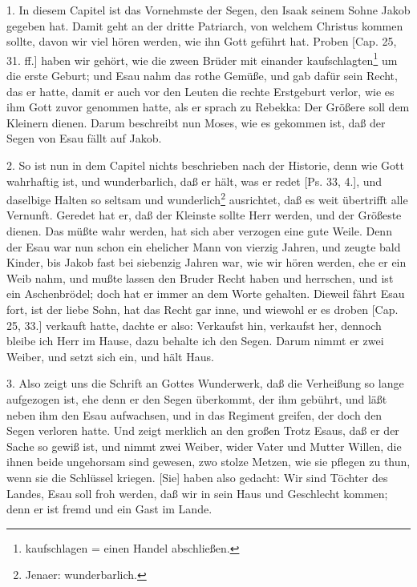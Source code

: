 1. In diesem Capitel ist das Vornehmste der Segen, den Isaak seinem Sohne Jakob gegeben hat. Damit geht an der dritte Patriarch, von welchem Christus kommen sollte, davon wir viel hören werden, wie ihn Gott geführt hat. Proben [Cap. 25, 31. ff.] haben wir gehört, wie die zween Brüder mit einander kaufschlagten\footnote{kaufschlagen = einen Handel abschließen.} um die erste Geburt; und Esau nahm das rothe Gemüße, und gab dafür sein Recht, das er hatte, damit er auch vor den Leuten die rechte Erstgeburt verlor, wie es ihm Gott zuvor genommen hatte, als er sprach zu Rebekka: Der Größere soll dem Kleinern dienen. Darum beschreibt nun Moses, wie es gekommen ist, daß der Segen von Esau fällt auf Jakob.

2. So ist nun in dem Capitel nichts beschrieben nach der Historie, denn wie Gott wahrhaftig ist, und wunderbarlich, daß er hält, was er redet [Ps. 33, 4.], und daselbige Halten so seltsam und wunderlich\footnote{Jenaer: wunderbarlich.} ausrichtet, daß es weit übertrifft alle Vernunft. Geredet hat er, daß der Kleinste sollte Herr werden, und der Größeste dienen. Das müßte wahr werden, hat sich aber verzogen eine gute Weile. Denn der Esau war nun schon ein ehelicher Mann von vierzig Jahren, und zeugte bald Kinder, bis Jakob fast bei siebenzig Jahren war, wie wir hören werden, ehe er ein Weib nahm, und mußte lassen den Bruder Recht haben und herrschen, und ist ein Aschenbrödel; doch hat er immer an dem Worte gehalten. Dieweil fährt Esau fort, ist der liebe Sohn, hat das Recht gar inne, und wiewohl er es droben [Cap. 25, 33.] verkauft hatte, dachte er also: Verkaufst hin, verkaufst her, dennoch bleibe ich Herr im Hause, dazu behalte ich den Segen. Darum nimmt er zwei Weiber, und setzt sich ein, und hält Haus.

3. Also zeigt uns die Schrift an Gottes Wunderwerk, daß die Verheißung so lange aufgezogen
ist, ehe denn er den Segen überkommt, der ihm gebührt, und läßt neben ihm den Esau aufwachsen, und in das Regiment greifen, der doch den Segen verloren hatte. Und zeigt merklich an den großen Trotz Esaus, daß er der Sache so gewiß ist, und nimmt zwei Weiber, wider Vater und Mutter Willen, die ihnen beide ungehorsam sind gewesen, zwo stolze Metzen, wie sie pflegen zu thun, wenn sie die Schlüssel kriegen. [Sie] haben also gedacht: Wir sind Töchter des Landes, Esau soll froh werden, daß wir in sein Haus und Geschlecht kommen; denn er ist fremd und ein Gast im Lande.

